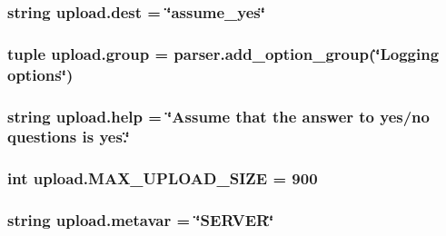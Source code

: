 \subsubsection[{dest}]{\setlength{\rightskip}{0pt plus 5cm}string upload.\+dest = \char`\"{}assume\+\_\+yes\char`\"{}}\label{namespaceupload_acddb2d9bf09b98fb6a205c368a8d8b1b}
\hypertarget{namespaceupload_a10f18f5b0686cf8efd48bed3c7531198}{}
\subsubsection[{group}]{\setlength{\rightskip}{0pt plus 5cm}tuple upload.\+group = parser.\+add\+\_\+option\+\_\+group(\char`\"{}Logging options\char`\"{})}\label{namespaceupload_a10f18f5b0686cf8efd48bed3c7531198}
\hypertarget{namespaceupload_a97085e2702061014275516de621b2143}{}
\subsubsection[{help}]{\setlength{\rightskip}{0pt plus 5cm}string upload.\+help = \char`\"{}Assume that the answer to yes/no questions is \textquotesingle{}yes\textquotesingle{}.\char`\"{}}\label{namespaceupload_a97085e2702061014275516de621b2143}
\hypertarget{namespaceupload_a6966fd583e8e019501eed303639d79b4}{}
\subsubsection[{M\+A\+X\+\_\+\+U\+P\+L\+O\+A\+D\+\_\+\+S\+I\+Z\+E}]{\setlength{\rightskip}{0pt plus 5cm}int upload.\+M\+A\+X\+\_\+\+U\+P\+L\+O\+A\+D\+\_\+\+S\+I\+Z\+E = 900}\label{namespaceupload_a6966fd583e8e019501eed303639d79b4}
\hypertarget{namespaceupload_a058e182e9caed3e0dde4d45270b26ebd}{}
\subsubsection[{metavar}]{\setlength{\rightskip}{0pt plus 5cm}string upload.\+metavar = \char`\"{}S\+E\+R\+V\+E\+R\char`\"{}}\label{namespaceupload_a058e182e9caed3e0dde4d45270b26ebd}
\hypertarget{namespaceupload_ab5aa3907065d7ff1de1405c141940845}{}
